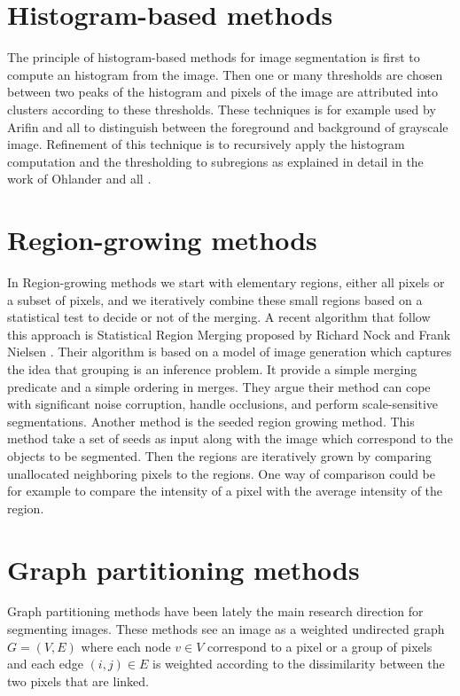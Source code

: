   \section{Histogram-based methods}

  The principle of histogram-based methods for image segmentation is first to compute an histogram from the image. Then one or many thresholds are chosen between two peaks of the histogram and pixels of the image are attributed into clusters according to these thresholds. These techniques is for example used by Arifin and all \cite{arifin2004image} to distinguish between the foreground and background of grayscale image. Refinement of this technique is to recursively apply the histogram computation and the thresholding to subregions as explained in detail in the work of Ohlander and all \cite{ohlander1978picture}.

  \section{Region-growing methods}

  In Region-growing methods we start with elementary regions, either all pixels or a subset of pixels, and we iteratively combine these small regions based on a statistical test to decide or not of the merging. A recent algorithm that follow this approach is Statistical Region Merging proposed by Richard Nock and Frank Nielsen \cite{nock2004statistical}. Their algorithm is based on a model of image generation which captures the idea that grouping is an inference problem. It provide a simple merging predicate and a simple ordering in merges. They argue their method can cope with significant noise corruption, handle occlusions, and perform scale-sensitive segmentations.
  Another method is the seeded region growing method. This method take a set of seeds as input along with the image which correspond to the objects to be segmented. Then the regions are iteratively grown by comparing unallocated neighboring pixels to the regions. One way of comparison could be for example to compare the intensity of a pixel with the average intensity of the region.

  \section{Graph partitioning methods}

  Graph partitioning methods have been lately the main research direction for segmenting images. These methods see an image as a weighted undirected graph \( G = (V,E) \) where each node \( v \in V \) correspond to a pixel or a group of pixels and each edge \( (i, j) \in E \) is weighted according to the dissimilarity between the two pixels that are linked.

